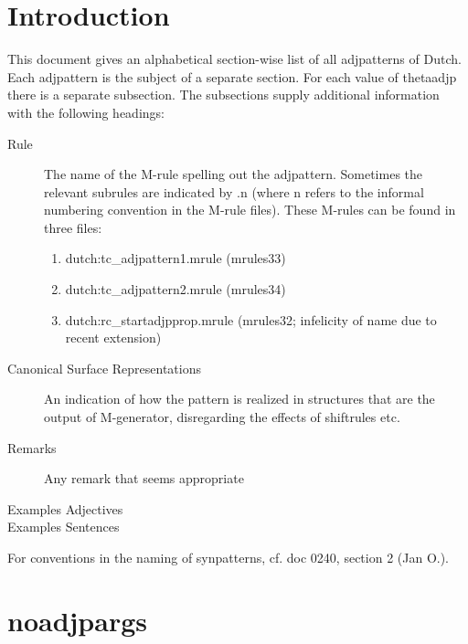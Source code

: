 

   \RosDate{\today}
   \RosSupersedes{-}
   \MakeRosTitle
%
%


\section{Introduction}

This document gives an alphabetical 
section-wise list of all adjpatterns of Dutch.
Each adjpattern is the subject of a separate section. For each value of 
thetaadjp there is a separate subsection. The subsections supply 
additional information with the following headings:
\begin{description}
  \item [Rule] The name of the M-rule spelling out the adjpattern.  Sometimes 
the relevant subrules are indicated by .n (where n refers to the informal 
numbering convention in the M-rule files). These M-rules can be found in three 
files:
\begin{enumerate}
  \item dutch:tc\_adjpattern1.mrule (mrules33)
  \item dutch:tc\_adjpattern2.mrule (mrules34)
  \item dutch:rc\_startadjpprop.mrule (mrules32; infelicity of name due to recent 
extension)
\end{enumerate}

  \item [Canonical Surface Representations] An indication of how the pattern
        is realized in structures that are the output of M-generator, 
disregarding the effects of shiftrules etc.
     
        
  \item [Remarks] Any remark that seems appropriate

  \item [Examples Adjectives] 
  \item [Examples Sentences] 
\end{description}

\noindent 
For conventions in the naming of synpatterns, cf. doc 0240, section 2 (Jan O.).

\newpage
\section{noadjpargs}
